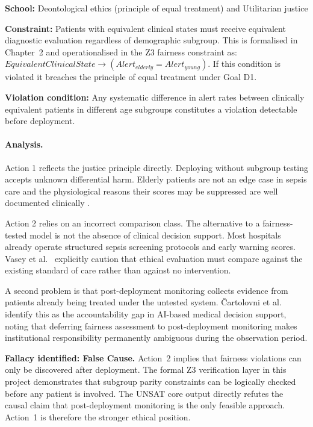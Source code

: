 \documentclass[]{UCD_CS_41820_Report}
\begin{document}
\textbf{School:} Deontological ethics (principle of equal treatment) and Utilitarian
justice

\textbf{Constraint:} Patients with equivalent clinical states must receive equivalent
diagnostic evaluation regardless of demographic subgroup. This is formalised in
Chapter~2 and operationalised in the Z3 fairness constraint as:
$\mathit{EquivalentClinicalState} \rightarrow (\mathit{Alert}_{elderly} =
\mathit{Alert}_{young})$. If this condition is violated it breaches the principle
of equal treatment under Goal D1.

\textbf{Violation condition:} Any systematic difference in alert rates between
clinically equivalent patients in different age subgroups constitutes a violation
detectable before deployment.

\paragraph{Analysis.}

Action 1 reflects the justice principle directly. Deploying without subgroup testing
accepts unknown differential harm. Elderly patients are not an edge case in sepsis
care and the physiological reasons their scores may be suppressed are well documented
clinically \cite{cull2023}.

Action 2 relies on an incorrect comparison class. The alternative to a
fairness-tested model is not the absence of clinical decision support. Most hospitals
already operate structured sepsis screening protocols and early warning scores.
Vasey et al.\ \cite{vasey2022} explicitly caution that ethical evaluation must
compare against the existing standard of care rather than against no intervention.

A second problem is that post-deployment monitoring collects evidence from patients
already being treated under the untested system. \v{C}artolovni et al.\
\cite{cartoloni2022} identify this as the accountability gap in AI-based medical
decision support, noting that deferring fairness assessment to post-deployment
monitoring makes institutional responsibility permanently ambiguous during the
observation period.
\par\medskip
\textbf{Fallacy identified: False Cause.} Action~2 implies that fairness violations
can only be discovered after deployment. The formal Z3 verification layer in this
project demonstrates that subgroup parity constraints can be logically checked before
any patient is involved. The UNSAT core output directly refutes the causal claim
that post-deployment monitoring is the only feasible approach. Action~1 is therefore
the stronger ethical position.
\end{document}
